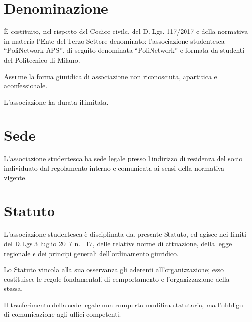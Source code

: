 \documentclass[legalpaper, 11pt]{exam}
\let\tempone\enumerate
\let\temptwo\endenumerate
\renewenvironment{enumerate}{\tempone\addtolength{\itemsep}{-0.45\baselineskip}}{\temptwo}
\begin{document}



\begin{center}

\end{center}




\section{Denominazione}
\begin{enumerate}
 \item È costituito, nel rispetto del Codice civile, del D. Lgs. 117/2017 e della normativa in materia l’Ente del Terzo Settore denominato: l’associazione studentesca “PoliNetwork APS”, di seguito denominata “PoliNetwork” e formata da studenti del Politecnico di Milano.
 \item Assume la forma giuridica di associazione non riconosciuta, apartitica e aconfessionale.
 \item L'associazione ha durata illimitata.
\end{enumerate}

\section{Sede}
\begin{enumerate}
 \item L’associazione studentesca ha sede legale presso l’indirizzo di residenza del socio individuato dal regolamento interno e comunicata ai sensi della normativa vigente.
\end{enumerate}

\section{Statuto}
\begin{enumerate}
 \item L’associazione studentesca è disciplinata dal presente Statuto, ed agisce nei limiti del D.Lgs 3 luglio 2017 n. 117, delle relative norme di attuazione, della legge regionale e dei principi generali dell’ordinamento giuridico.
 \item Lo Statuto vincola alla sua osservanza gli aderenti all’organizzazione; esso costituisce le regole fondamentali di comportamento e l’organizzazione della stessa.
 \item Il trasferimento della sede legale non comporta modifica statutaria, ma l’obbligo di comunicazione agli uffici competenti.
\end{enumerate}
\end{document}
